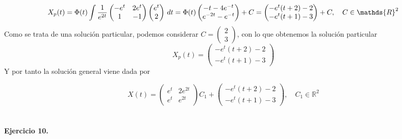 \documentclass[fleqn]{article}
\def\R{\mathds{R}}
\begin{document}
    $$X_p(t) = \Phi(t) \int 
    \frac{1}{e^{2t}}
    \begin{pmatrix}
        -e^t & 2e^t\\
        1 & -1
    \end{pmatrix}
    \begin{pmatrix}
        e^t \\ 2
    \end{pmatrix}
    \thinspace dt = \Phi(t)
    \begin{pmatrix}
        -t - 4e^{-t}\\
        e^{-2t} - e^{-t}
    \end{pmatrix}
    +C = 
    \begin{pmatrix}
        -e^t(t+2) -2\\
        -e^t(t+1) -3
    \end{pmatrix}
    +C, \quad C \in \R^2
    $$
    Como se trata de una solución particular, podemos considerar $C=\begin{pmatrix} 2 \\ 3\end{pmatrix}$, con lo que obtenemos la solución particular
    $$X_p(t)=
    \begin{pmatrix}
        -e^t(t+2) -2\\
        -e^t(t+1) -3
    \end{pmatrix}$$
    Y por tanto la solución general viene dada por 

    $$X(t)= 
    \begin{pmatrix}
        e^t & 2e^{2t}\\
        e^t & e^{2t}
    \end{pmatrix}
    C_1 + 
    \begin{pmatrix}
        -e^t(t+2) -2\\
        -e^t(t+1) -3
    \end{pmatrix}, \quad C_1\in\R^2
    $$\\ \\

    \textbf{Ejercicio 10. } \\
\end{document}
